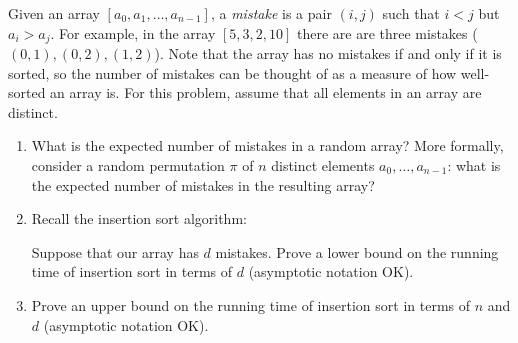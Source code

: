 \documentclass[11pt]{article}
\begin{document}
Given an array $[a_0, a_1, \dots, a_{n-1}]$, a \emph{mistake} is a pair $(i,j)$ such that $i < j$ but $a_i > a_j$.  For example, in the array $[5, 3, 2, 10]$ there are are three mistakes ($(0,1), (0, 2), (1,2)$).  Note that the array has no mistakes if and only if it is sorted, so the number of mistakes can be thought of as a measure of how well-sorted an array is.  For this problem, assume that all elements in an array are distinct.

\begin{enumerate}
\item What is the expected number of mistakes in a random array?  More formally, consider a random permutation $\pi$ of $n$ distinct elements $a_0, \dots, a_{n-1}$: what is the expected number of mistakes in the resulting array?

\item Recall the insertion sort algorithm: 

\begin{algorithm}[H]
\end{algorithm}

Suppose that our array has $d$ mistakes.  Prove a lower bound on the running time of insertion sort in terms of $d$ (asymptotic notation OK).

\item Prove an upper bound on the running time of insertion sort in terms of $n$ and $d$ (asymptotic notation OK).

\end{enumerate}
\end{document}
